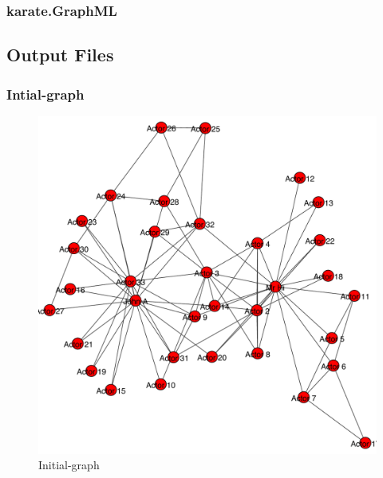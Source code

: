 \documentclass[12pt]{article}
\begin{document}
\subsubsection{karate.GraphML}

\newpage

\subsection{Output Files}
\subsubsection{Intial-graph}

 
\begin{figure}[ht]
\includegraphics[scale=0.7]{../qn2/graph3.pdf}
\centering
\caption{Initial-graph}
\label{fig:Initial graph}
\end{figure}
\newpage
\end{document}
